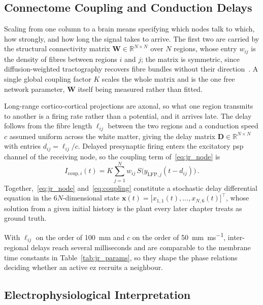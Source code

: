 \subsection{Connectome Coupling and Conduction Delays}
\label{sec:connectome}

Scaling from one column to a brain means specifying which nodes talk to which, how
strongly, and how long the signal takes to arrive. The first two are carried by the
structural connectivity matrix $\mathbf{W} \in \mathbb{R}^{N \times N}$ over $N$ regions,
whose entry $w_{ij}$ is the density of fibres between regions $i$ and $j$; the matrix is
symmetric, since diffusion-weighted tractography recovers fibre bundles without their
direction~\cite{SanzLeon2013}. A %
single global coupling factor $K$ scales the whole matrix and is the one free network
parameter, $\mathbf{W}$ itself being measured rather than fitted.

Long-range cortico-cortical projections are axonal, so what one region transmits to another
is a firing rate rather than a potential, and it arrives late. The delay follows from the
fibre length $\ell_{ij}$ between the two regions and a conduction speed $c$ assumed uniform
across the white matter, giving the delay matrix $\mathbf{D} \in \mathbb{R}^{N \times N}$
with entries $d_{ij} = \ell_{ij} / c$. Delayed presynaptic firing enters the excitatory
\ac{psp} channel of the receiving node, so the coupling term of~\eqref{eq:jr_node} is
%
\begin{equation}
    I_{\mathrm{coup},i}(t) = K \sum_{j=1}^{N} w_{ij}\, S\!\big(y_{\mathrm{LFP},j}(t - d_{ij})\big) \,.
    \label{eq:coupling}
\end{equation}
%
Together,~\eqref{eq:jr_node} and~\eqref{eq:coupling} constitute a stochastic delay
differential equation in the $6N$-dimensional state
$\mathbf{x}(t) = \big[x_{1, 1}(t), \dots, x_{N, 6}(t)\big]^\top$, whose solution from a given
initial history is the plant every later chapter treats as ground truth.

With $\ell_{ij}$ on the order of \SI{100}{\milli\metre} and $c$ on the order of
\SI{50}{\milli\metre\per\milli\second}, inter-regional delays reach several milliseconds and
are comparable to the membrane time constants in Table~\ref{tab:jr_params}, so they shape
the phase relations deciding whether an active \ac{ez} recruits a neighbour.

\subsection{Electrophysiological Interpretation}
\label{sec:electro}

